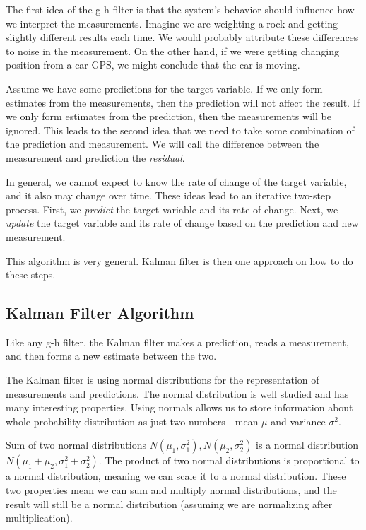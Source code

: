 The first idea of the g-h filter is that the system's behavior should influence how we interpret the measurements. Imagine we are weighting a rock and getting slightly different results each time. We would probably attribute these differences to noise in the measurement. On the other hand, if we were getting changing position from a car GPS, we might conclude that the car is moving.

Assume we have some predictions for the target variable.  If we only form estimates from the measurements, then the prediction will not affect the result. If we only form estimates from the prediction, then the measurements will be ignored. This leads to the second idea that we need to take some combination of the prediction and measurement. We will call the difference between the measurement and prediction the \textit{residual}. 

In general, we cannot expect to know the rate of change of the target variable, and it also may change over time. These ideas lead to an iterative two-step process. First, we \textit{predict} the target variable and its rate of change. Next, we \textit{update} the target variable and its rate of change based on the prediction and new measurement.

This algorithm is very general. Kalman filter is then one approach on how to do these steps.

\subsection{Kalman Filter Algorithm}

Like any g-h filter, the Kalman filter makes a prediction, reads a measurement, and then forms a new estimate between the two.

The Kalman filter is using normal distributions for the representation of measurements and predictions. The normal distribution is well studied and has many interesting properties. Using normals allows us to store information about whole probability distribution as just two numbers - mean $\mu$ and variance $\sigma^2$.

Sum of two normal distributions $N(\mu_1, \sigma^2_1), N(\mu_2, \sigma^2_2)$ is a normal distribution $N(\mu_1 + \mu_2, \sigma^2_1 + \sigma^2_2)$. The product of two normal distributions is proportional to a normal distribution, meaning we can scale it to a normal distribution. These two properties mean we can sum and multiply normal distributions, and the result will still be a normal distribution (assuming we are normalizing after multiplication). 

